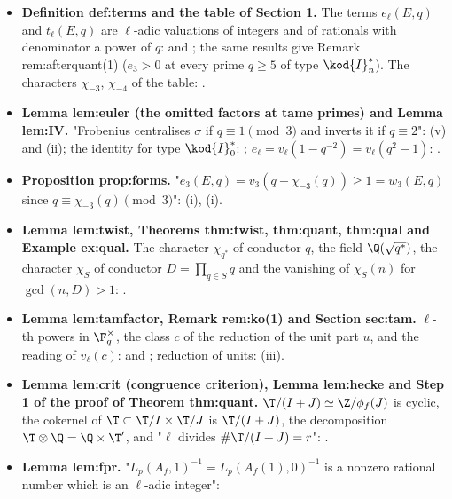 \begin{itemize}
\item \textbf{Definition def:terms and the table of Section 1.} The terms $e_\ell(E,q)$ and $t_\ell(E,q)$ are $\ell$-adic valuations
of integers and of rationals with denominator a power of $q$: 
and ; the same results give Remark rem:afterquant(1) ($e_3>0$ at every prime $q\ge5$ of type $\kod{I}_n^*$). The
characters $\chi_{-3}$, $\chi_{-4}$ of the table: .
\item \textbf{Lemma lem:euler (the omitted factors at tame primes) and Lemma lem:IV.} "Frobenius centralises $\sigma$ if
$q\equiv1\pmod3$ and inverts it if $q\equiv2$": (v) and (ii); the
identity for type $\kod{I}_0^*$: ; $e_\ell=v_\ell(1-q^{-2})=v_\ell(q^2-1)$: .
\item \textbf{Proposition prop:forms.} "$e_3(E,q)=v_3(q-\chi_{-3}(q))\ge1=w_3(E,q)$ since $q\equiv\chi_{-3}(q)\pmod3$": (i),
(i).
\item \textbf{Lemma lem:twist, Theorems thm:twist, thm:quant, thm:qual and Example ex:qual.} The character $\chi_{q^*}$ of
conductor $q$, the field $\Q(\sqrt{q^*})$, the character $\chi_S$ of conductor $D=\prod_{q\in S}q$ and the vanishing of
$\chi_S(n)$ for $\gcd(n,D)>1$: .
\item \textbf{Lemma lem:tamfactor, Remark rem:ko(1) and Section sec:tam.} $\ell$-th powers in $\F_q^\times$, the class $c$ of the
reduction of the unit part $u$, and the reading of $v_\ell(c)$:  and
; reduction of units: (iii).
\item \textbf{Lemma lem:crit (congruence criterion), Lemma lem:hecke and Step 1 of the proof of Theorem thm:quant.}
$\T/(I+J)\simeq\Z/\phi_f(J)$ is cyclic, the cokernel of $\T\subset\T/I\times\T/J$ is $\T/(I+J)$, the decomposition
$\T\otimes\Q=\Q\times\T'$, and "$\ell$ divides $\#\T/(I+J)=r$": .
\item \textbf{Lemma lem:fpr.} "$L_p(A_f,1)^{-1}=L_p(A_f(1),0)^{-1}$ is a nonzero rational number which is an $\ell$-adic integer":

\end{itemize}
